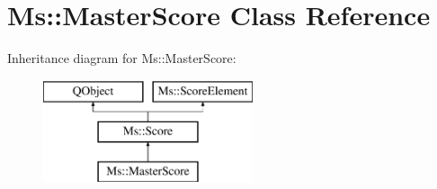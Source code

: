 \hypertarget{class_ms_1_1_master_score}{}\section{Ms\+:\+:Master\+Score Class Reference}
\label{class_ms_1_1_master_score}
Inheritance diagram for Ms\+:\+:Master\+Score\+:\begin{figure}[H]
\begin{center}
\leavevmode
\includegraphics[height=3.000000cm]{class_ms_1_1_master_score}
\end{center}
\end{figure}
